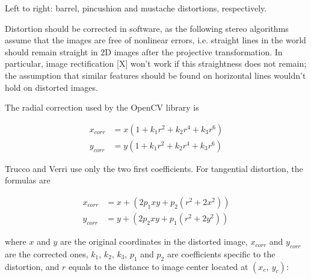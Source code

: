 
{Left to right: barrel, pincushion and mustache distortions, respectively.}

Distortion should be corrected in software, as the following stereo algorithms assume that the images are free of nonlinear errors, i.e. straight lines in the world should remain straight in 2D images after the projective transformation.
In particular, image rectification [X] won't work if this straightness does not remain; the assumption that similar features should be found on horizontal lines wouldn't hold on distorted images.

The radial correction used by the OpenCV library is

\begin{align}
	x_{corr} &= x(1 + k_1 r^2 + k_2 r^4 + k_3 r^6)\\
	y_{corr} &= y(1 + k_1 r^2 + k_2 r^4 + k_3 r^6)
\end{align}

Trucco and Verri \cite{trucco1998introductory} use only the two first coefficients. For tangential distortion, the formulas are

\begin{align}
x_{corr} &= x + (2 p_1 x y + p_2 (r^2 + 2 x^2))\\
y_{corr} &= y + (2 p_2 x y + p_1 (r^2 + 2 y^2))
\end{align}

where $x$ and $y$ are the original coordinates in the distorted image, $x_{corr}$ and $y_{corr}$ are the corrected ones, $k_1$, $k_2$, $k_3$, $p_1$ and $p_2$ are coefficients specific to the distortion, and $r$ equals to the distance to image center located at $(x_c,~y_c)$:

